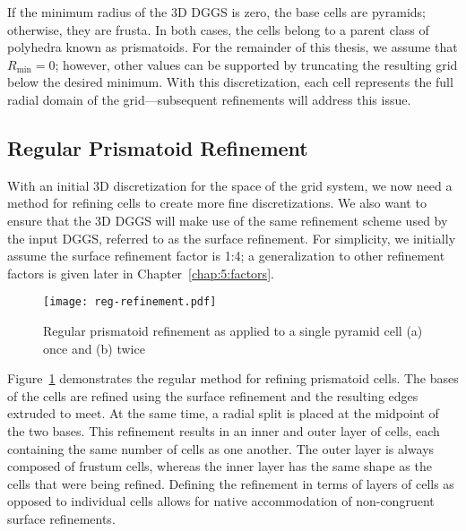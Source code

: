 If the minimum radius of the 3D DGGS is zero, the base cells are pyramids; otherwise, they are frusta.
In both cases, the cells belong to a parent class of polyhedra known as prismatoids.
For the remainder of this thesis, we assume that $R_\mathrm{min} = 0$; however, other values can be supported by truncating the resulting grid below the desired minimum.
With this discretization, each cell represents the full radial domain of the grid---subsequent refinements will address this issue.


\subsection{Regular Prismatoid Refinement} \label{chap:5:regular}
With an initial 3D discretization for the space of the grid system, we now need a method for refining cells to create more fine discretizations.
We also want to ensure that the 3D DGGS will make use of the same refinement scheme used by the input DGGS, referred to as the surface refinement.
For simplicity, we initially assume the surface refinement factor is 1:4; a generalization to other refinement factors is given later in Chapter~\ref{chap:5:factors}.


\begin{figure}[ht!]
	\centering
	\texttt{[image: reg-refinement.pdf]}
	\caption[Regular prismatoid refinement]{
		Regular prismatoid refinement as applied to a single pyramid cell (a) once and (b) twice
	}
	\label{fig:regular}
\end{figure}


Figure~\ref{fig:regular} demonstrates the regular method for refining prismatoid cells.
The bases of the cells are refined using the surface refinement and the resulting edges extruded to meet.
At the same time, a radial split is placed at the midpoint of the two bases.
This refinement results in an inner and outer layer of cells, each containing the same number of cells as one another.
The outer layer is always composed of frustum cells, whereas the inner layer has the same shape as the cells that were being refined.
Defining the refinement in terms of layers of cells as opposed to individual cells allows for native accommodation of non-congruent surface refinements.


